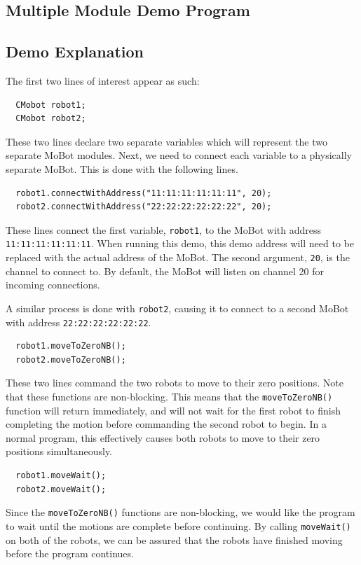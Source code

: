\documentclass{article}
\begin{document}
\subsection{Multiple Module Demo Program}


\subsection{Demo Explanation}
The first two lines of interest appear as such:
\begin{verbatim}
  CMobot robot1;
  CMobot robot2;
\end{verbatim}
These two lines declare two separate variables which will represent the
two separate MoBot modules. Next, we need to connect each variable to
a physically separate MoBot. This is done with the following lines.
\begin{verbatim}
  robot1.connectWithAddress("11:11:11:11:11:11", 20);
  robot2.connectWithAddress("22:22:22:22:22:22", 20);
\end{verbatim}
These lines connect the first variable, \texttt{robot1}, to the MoBot with
address \texttt{11:11:11:11:11:11}. When running this demo, this
demo address will need to be replaced with the actual address of the MoBot.
The second argument, \texttt{20}, is the channel to connect to. By default,
the MoBot will listen on channel 20 for incoming connections.

A similar process is done with \texttt{robot2}, causing it to connect
to a second MoBot with address \texttt{22:22:22:22:22:22}.

\begin{verbatim}
  robot1.moveToZeroNB();
  robot2.moveToZeroNB();
\end{verbatim}
These two lines command the two robots to move to their zero positions.
Note that these functions are non-blocking. This means that the
\texttt{moveToZeroNB()} function will return immediately, and will not
wait for the first robot to finish completing the motion before 
commanding the second robot to begin. In a normal program, this effectively
causes both robots to move to their zero positions simultaneously.

\begin{verbatim}
  robot1.moveWait();
  robot2.moveWait();
\end{verbatim}
Since the \texttt{moveToZeroNB()} functions are non-blocking, we would like
the program to wait until the motions are complete before continuing. By
calling \texttt{moveWait()} on both of the robots, we can be assured that
the robots have finished moving before the program continues.
\end{document}
